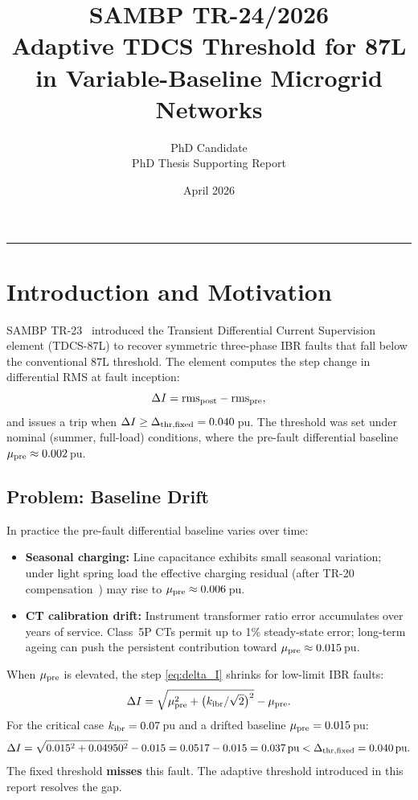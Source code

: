 \documentclass[11pt,a4paper]{article}
\title{%
  \textbf{SAMBP TR-24/2026}\\[4pt]
  Adaptive TDCS Threshold for 87L\\
  in Variable-Baseline Microgrid Networks}
\author{PhD Candidate\\PhD Thesis Supporting Report}
\date{April 2026}
\begin{document}
\maketitle
\tableofcontents
\vspace{6pt}\hrule\vspace{10pt}

\section{Introduction and Motivation}

SAMBP TR-23~\cite{SAMBP_TR23} introduced the Transient Differential Current
Supervision element (TDCS-87L) to recover symmetric three-phase IBR faults
that fall below the conventional 87L threshold.  The element computes the
step change in differential RMS at fault inception:
\begin{equation}
  \Delta I = \mathrm{rms}_{\rm post} - \mathrm{rms}_{\rm pre},
  \label{eq:delta_I}
\end{equation}
and issues a trip when $\Delta I \geq \Delta_{\rm thr,fixed} = 0.040$\,pu.
The threshold was set under nominal (summer, full-load) conditions, where
the pre-fault differential baseline $\mu_{\rm pre} \approx 0.002$\,pu.

\subsection{Problem: Baseline Drift}

In practice the pre-fault differential baseline varies over time:
\begin{itemize}
  \item \textbf{Seasonal charging:} Line capacitance exhibits small seasonal
    variation; under light spring load the effective charging residual
    (after TR-20 compensation~\cite{SAMBP_TR20}) may rise to
    $\mu_{\rm pre}\approx 0.006$\,pu.
  \item \textbf{CT calibration drift:} Instrument transformer ratio error
    accumulates over years of service.  Class~5P CTs permit up to 1\% steady-state
    error; long-term ageing can push the persistent contribution toward
    $\mu_{\rm pre}\approx 0.015$\,pu.
\end{itemize}

When $\mu_{\rm pre}$ is elevated, the step \eqref{eq:delta_I} shrinks
for low-limit IBR faults:
\begin{equation}
  \Delta I = \sqrt{\mu_{\rm pre}^{2} + \bigl(k_{\rm ibr}/\sqrt{2}\bigr)^{2}}
             - \mu_{\rm pre}.
  \label{eq:delta_I_drift}
\end{equation}
For the critical case $k_{\rm ibr}=0.07$\,pu and a drifted baseline
$\mu_{\rm pre}=0.015$\,pu:
\begin{equation}
  \Delta I = \sqrt{0.015^{2}+0.04950^{2}}-0.015 = 0.0517-0.015
           = 0.037\,\text{pu} < \Delta_{\rm thr,fixed} = 0.040\,\text{pu}.
\end{equation}
The fixed threshold \textbf{misses} this fault.  The adaptive threshold
introduced in this report resolves the gap.
\end{document}
